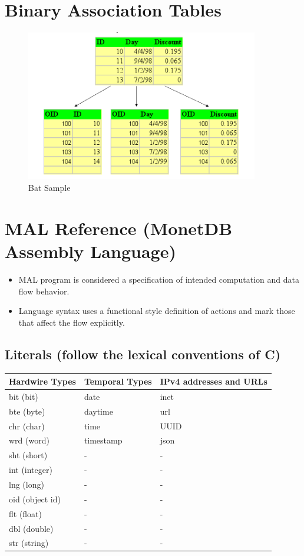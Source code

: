 \documentclass[11pt]{article}
\begin{document}
\section{Binary Association Tables}
\label{sec:org86d557f}
\begin{figure}[htbp]
\centering
\includegraphics[width=4.0in]{./Pictures/BAT.png}
\caption{\label{fig:orga06a27c}
Bat Sample}
\end{figure}




\section{MAL Reference (MonetDB Assembly Language)}
\label{sec:org4029819}

\begin{itemize}
\item MAL program is considered a specification of intended computation and data flow behavior.
\item Language syntax uses a functional style definition of actions and mark those that affect the flow explicitly.
\end{itemize}

\subsection{Literals (follow the lexical conventions of C)}
\label{sec:orge95f77b}

\begin{center}
\begin{tabular}{lll}
\hline
\textbf{Hardwire Types} & \textbf{Temporal Types} & \textbf{IPv4 addresses and URLs}\\
\hline
bit (bit) & date & inet\\
\hline
bte (byte) & daytime & url\\
\hline
chr (char) & time & UUID\\
\hline
wrd (word) & timestamp & json\\
\hline
sht (short) & - & -\\
\hline
int (integer) & - & -\\
\hline
lng (long) & - & -\\
\hline
oid (object id) & - & -\\
\hline
flt (float) & - & -\\
\hline
dbl (double) & - & -\\
\hline
str (string) & - & -\\
\hline
\end{tabular}
\end{center}
\end{document}
